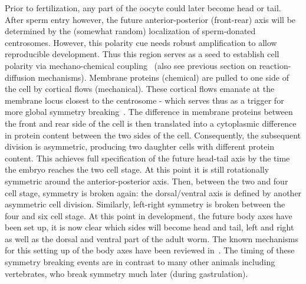 \documentclass[fleqn,10pt]{wlscirep}
\begin{document}
Prior to fertilization, any part of the oocyte could later become head or tail. After sperm entry however, the future anterior-posterior (front-rear) axis will be determined by the (somewhat random) localization of sperm-donated centrosomes. However, this polarity cue needs robust amplification to allow reproducible development. Thus this region serves as a seed to establish cell polarity via mechano-chemical coupling~\cite{Goehring2013} (also see previous section on reaction-diffusion mechanisms). Membrane proteins (chemical) are pulled to one side of the cell by cortical flows (mechanical). These cortical flows emanate at the membrane locus closest to the centrosome - which serves thus as a trigger for more global symmetry breaking~\cite{Rose2014}. The difference in membrane proteins between the front and rear side of the cell is then translated into a cytoplasmic difference in protein content between the two sides of the cell. Consequently, the subsequent division is asymmetric, producing two daughter cells with different protein content. This achieves full specification of the future head-tail axis by the time the embryo reaches the two cell stage. At this point it is still rotationally symmetric around the anterior-posterior axis. Then, between the two and four cell stage, symmetry is broken again: the dorsal/ventral axis is defined by another asymmetric cell division. Similarly, left-right symmetry is broken between the four and six cell stage. At this point in development, the future body axes have been set up, it is now clear which sides will become head and tail, left and right as well as the dorsal and ventral part of the adult worm. The known mechanisms for this setting up of the body axes have been reviewed in~\cite{Rose2014}. The timing of these symmetry breaking events are in contrast to many other animals including vertebrates, who break symmetry much later (during gastrulation). 





\end{document}

